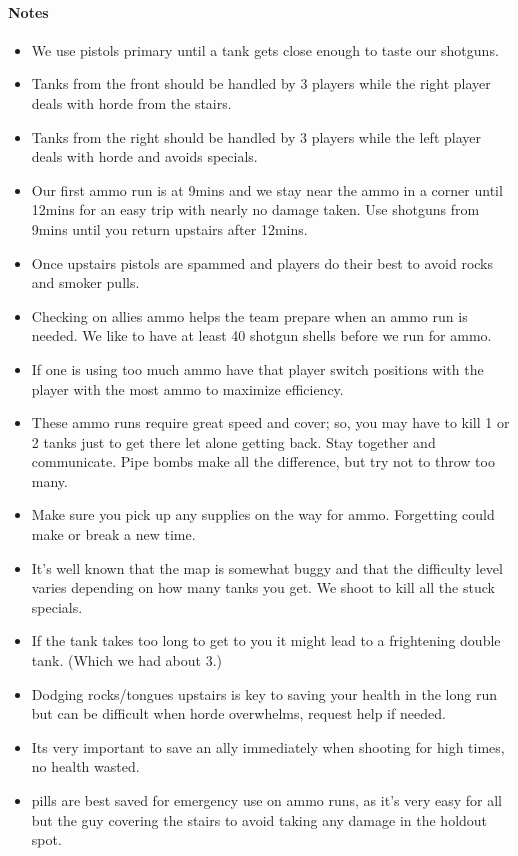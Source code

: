\paragraph{Notes}
\begin{itemize}
\item We use pistols primary until a tank gets close enough to taste our shotguns.
\item Tanks from the front should be handled by 3 players while the right player deals with horde from the stairs.
\item Tanks from the right should be handled by 3 players while the left player deals with horde and avoids specials.
\item Our first ammo run is at 9mins and we stay near the ammo in a corner until 12mins for an easy trip with nearly no damage taken. Use shotguns from 9mins until you return upstairs after 12mins.
\item Once upstairs pistols are spammed and players do their best to avoid rocks and smoker pulls.
\item Checking on allies ammo helps the team prepare when an ammo run is needed. We like to have at least 40 shotgun shells before we run for ammo. 
\item If one is using too much ammo have that player switch positions with the player with the most ammo to maximize efficiency. 
\item These ammo runs require great speed and cover; so, you may have to kill 1 or 2 tanks just to get there let alone getting back. Stay together and communicate. Pipe bombs make all the difference, but try not to throw too many.
\item Make sure you pick up any supplies on the way for ammo. Forgetting could make or break a new time.
\item It's well known that the map is somewhat buggy and that the difficulty level varies depending on how many tanks you get. We shoot to kill all the stuck specials. 
\item If the tank takes too long to get to you it might lead to a frightening double tank. (Which we had about 3.)
\item Dodging rocks/tongues upstairs is key to saving your health in the long run but can be difficult when horde overwhelms, request help if needed.
\item Its very important to save an ally immediately when shooting for high times, no health wasted.
\item pills are best saved for emergency use on ammo runs, as it's very easy for all but the guy covering the stairs to avoid taking any damage in the holdout spot.

\end{itemize}
